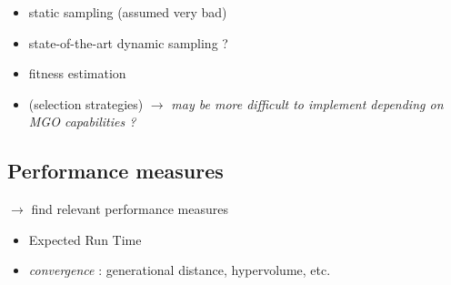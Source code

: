 \begin{itemize}
\item static sampling (assumed very bad)
\item state-of-the-art dynamic sampling ?
\item fitness estimation
\item (selection strategies) $\rightarrow$ \textit{may be more difficult to implement depending on MGO capabilities ?}
\end{itemize}


\subsection{Performance measures}


$\rightarrow$ find relevant performance measures

\begin{itemize}
\item Expected Run Time
\item \textit{convergence} : generational distance, hypervolume, etc.
\end{itemize}
















